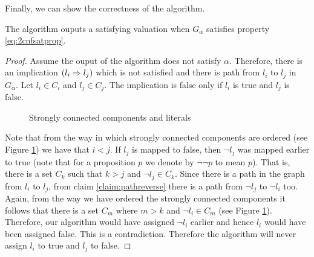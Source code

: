 Finally, we can show the correctness of the algorithm. 
\begin{theorem}
The algorithm ouputs a satisfying valuation when $G_{\alpha}$ satisfies property \ref{eq:2cnfsatprop}.
\label{thm:2cnfasscorrect}
\end{theorem}
\begin{proof}
Assume the ouput of the algorithm does not satisfy $\alpha$. Therefore, there is an implication $(l_i \Rightarrow l_j)$ which is not satisfied and there is path from $l_i$ to $l_j$ in $G_{\alpha}$. Let $l_i \in C_i$ and $l_j \in C_j$. The implication is false only if $l_i$ is true and $l_j$ is false. 
\begin{figure}[!h]
  \centering
  \caption{Strongly connected components and literals}
  \label{fig:strongcomponents}
\end{figure}
Note that from the way in which strongly connected components are ordered (see Figure \ref{fig:strongcomponents}) we have that $i < j$.  If $l_j$ is mapped to false, then $\neg l_j$ was mapped earlier to true (note that for a proposition $p$ we denote by $\neg \neg p$ to mean $p$). That is, there is a set $C_k$ such that $k> j$ and $\neg l_j \in C_k$.  Since there is a path in the graph from $l_i$ to $l_j$, from claim \ref{claim:pathreverse} there is a path from $\neg l_j$ to $\neg l_i$ too. Again, from the way we have ordered the strongly connected components it follows that there is a set $C_{m}$ where $m > k$ and $\neg l_i \in C_m$ (see Figure \ref{fig:strongcomponents}). Therefore, our algorithm would have assigned $\neg l_i$ earlier and hence $l_i$ would have been assigned false. This is a contradiction. Therefore the algorithm will never assign $l_i$ to true and $l_j$ to false.
\end{proof}


